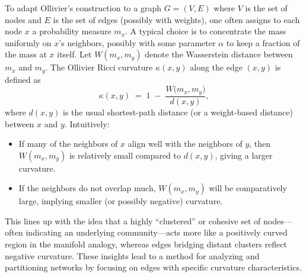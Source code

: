 To adapt Ollivier's construction to a graph $G = (V,E)$ where $V$ is the set of nodes and $E$ is the set of edges (possibly with weights), one often assigns to each node $x$ a probability measure $m_x$. A typical choice is to concentrate the mass uniformly on $x$’s neighbors, possibly with some parameter $\alpha$ to keep a fraction of the mass at $x$ itself. Let $W(m_x, m_y)$ denote the Wasserstein distance between $m_x$ and $m_y$. The Ollivier Ricci curvature $\kappa(x,y)$ along the edge $(x,y)$ is defined as 
\[
\kappa(x,y) \;=\; 1 \;-\;\frac{W\bigl(m_x, m_y\bigr)}{d(x,y)},
\]
where $d(x,y)$ is the usual shortest-path distance (or a weight-based distance) between $x$ and $y$. Intuitively:
\begin{itemize}
    \item If many of the neighbors of $x$ align well with the neighbors of $y$, then $W(m_x,m_y)$ is relatively small compared to $d(x,y)$, giving a larger curvature.
    \item If the neighbors do not overlap much, $W(m_x,m_y)$ will be comparatively large, implying smaller (or possibly negative) curvature.
\end{itemize}
This lines up with the idea that a highly ``clustered'' or cohesive set of nodes—often indicating an underlying community—acts more like a positively curved region in the manifold analogy, whereas edges bridging distant clusters reflect negative curvature. These insights lead to a method for analyzing and partitioning networks by focusing on edges with specific curvature characteristics.


